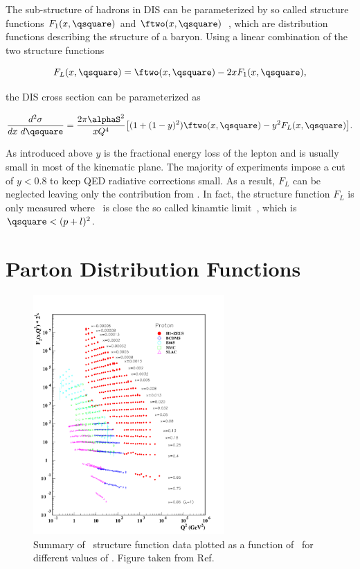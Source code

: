 The sub-structure of hadrons in DIS can be parameterized by so called structure functions $F_{1}(x,\qsquare)$ and $\ftwo(x,\qsquare)$~\cite{Kovchegov:2012mbw}, which are distribution functions describing the structure of a baryon. Using a linear combination of the two structure functions

\begin{equation}
F_{L}(x,\qsquare) = \ftwo(x,\qsquare) - 2xF_{1}(x,\qsquare),
\end{equation}

the DIS cross section can be parameterized as  

\begin{eqnarray}
\frac{d^{2}\sigma}{dx\ d\qsquare} = \frac{2\pi\alphaS^{2}}{xQ^{4}}\big[(1 + (1-y)^{2})\ftwo(x,\qsquare) - y^{2}F_{L}(x,\qsquare)\big].
\label{eqn:discrosssection}
\end{eqnarray}
	
	
As introduced above $y$ is the fractional energy loss of the lepton and is usually small in most of the kinematic plane. The majority of experiments impose a cut of $y < 0.8$ to keep QED radiative corrections small. As a result, $F_{L}$ can be neglected leaving only the  contribution from \ftwo. In fact, the structure function $F_{L}$ is only measured where \qsquare\ is close the so called kinamtic limit~\cite{Seymour:2005hs}, which is $\qsquare < (p + l)^2$. 


\section{Parton Distribution Functions}


\begin{figure}
	\centerline{
		\includegraphics[width=0.65\textwidth]{figures/f2collider_logf2.pdf} 
	}
	\caption{ Summary of \ftwo\ structure function data plotted as a function of \qsquare\ for different values of \xb. Figure taken from Ref.~\cite{pdg:2018} }
	\label{fig:f2}
\end{figure}



